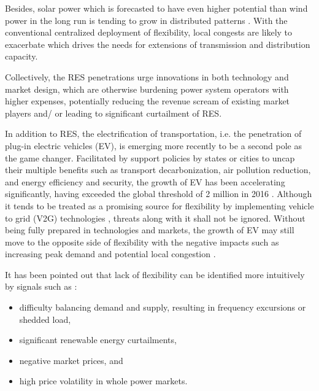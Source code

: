 Besides, solar power which is forecasted to have even higher potential than wind power in the long run is tending to grow in distributed patterns \cite{Agency2016,Epia2016,Sawyer2016}. With the conventional centralized deployment of flexibility, local congests are likely to exacerbate \cite{Lund2015,STEINKE2013826} which drives the needs for extensions of transmission and distribution capacity.

Collectively, the RES penetrations urge innovations in both technology and market design, which are otherwise burdening power system operators with higher expenses, potentially reducing the revenue scream of existing market players and/ or leading to significant curtailment of RES.

In addition to RES, the electrification of transportation, i.e. the penetration of plug-in electric vehicles (EV), is emerging more recently to be a second pole as the game changer. Facilitated by support policies by states or cities to uncap their multiple benefits such as transport decarbonization, air pollution reduction, and energy efficiency and security, the growth of EV has been accelerating significantly, having exceeded the global threshold of 2 million in 2016 \cite{InternationalEnergyAgency2017}. Although it tends to be treated as a promising source for flexibility by implementing vehicle to grid (V2G) technologies \cite{Size2016,Habib2015,Foley2013}, threats along with it shall not be ignored. Without being fully prepared in technologies and markets, the growth of EV may still move to the opposite side of flexibility with the negative impacts such as increasing peak demand and potential local congestion \cite{Green2011,DBLP:journals/corr/PournarasJZFS17}.

It has been pointed out that lack of flexibility can be identified more intuitively by signals such as \cite{Cochran2014,Wang2017}:
\begin{itemize}
	\item difficulty balancing demand and supply, resulting in frequency excursions or shedded load,
	\item significant renewable energy curtailments,
	\item negative market prices, and
	\item high price volatility in whole power markets.
\end{itemize}

